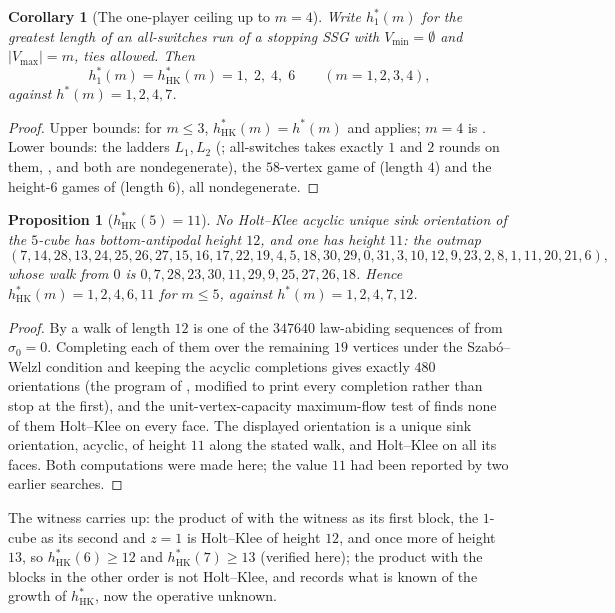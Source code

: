 \documentclass[11pt]{article}
\theoremstyle{plain}
\newtheorem{proposition}[theorem]{Proposition}
\newtheorem{corollary}[theorem]{Corollary}
\theoremstyle{definition}
\newcommand{\Vmax}{V_{\max}}
\newcommand{\Vmin}{V_{\min}}
\begin{document}
\begin{corollary}[The one-player ceiling up to $m=4$]\label{cor:hstar-one}
Write $h^{\ast}_{1}(m)$ for the greatest length of an all-switches run
of a stopping SSG with $\Vmin=\emptyset$ and $|\Vmax|=m$, ties allowed.
Then
\[
  h^{\ast}_{1}(m)=h^{\ast}_{\mathrm{HK}}(m)=1,\;2,\;4,\;6\qquad(m=1,2,3,4),
\]
against $h^{\ast}(m)=1,2,4,7$.
\end{corollary}

\begin{proof}
Upper bounds: for $m\le3$, $h^{\ast}_{\mathrm{HK}}(m)=h^{\ast}(m)$ and
 applies; $m=4$ is . Lower
bounds: the ladders $L_1,L_2$ (; all-switches takes
exactly $1$ and $2$ rounds on them, , and both are
nondegenerate), the $58$-vertex game of  (length
$4$) and the height-$6$ games of  (length $6$), all
nondegenerate.
\end{proof}

\begin{proposition}[$h^{\ast}_{\mathrm{HK}}(5)=11$]\label{prop:hkfive}
No Holt--Klee acyclic unique sink orientation of the $5$-cube has
bottom-antipodal height $12$, and one has height $11$: the outmap
\[
  (7,14,28,13,24,25,26,27,15,16,17,22,19,4,5,18,30,29,0,31,3,10,12,9,23,2,8,1,11,20,21,6),
\]
whose walk from $0$ is $0,7,28,23,30,11,29,9,25,27,26,18$. Hence
$h^{\ast}_{\mathrm{HK}}(m)=1,2,4,6,11$ for $m\le5$, against
$h^{\ast}(m)=1,2,4,7,12$.
\end{proposition}

\begin{proof}
By  a walk of length $12$ is one of the $347640$
law-abiding sequences of  from $\sigma_0=0$.
Completing each of them over the remaining $19$ vertices under the
Szab\'o--Welzl condition and keeping the acyclic completions gives exactly
$480$ orientations (the program of , modified to
print every completion rather than stop at the first), and the
unit-vertex-capacity maximum-flow test of 
finds none of them Holt--Klee on every face. The displayed orientation is
a unique sink orientation, acyclic, of height $11$ along the stated walk,
and Holt--Klee on all its faces. Both computations were made here; the
value $11$ had been reported by two earlier searches.
\end{proof}

The witness carries up: the product of  with the
witness as its first block, the $1$-cube as its second and $z=1$ is
Holt--Klee of height $12$, and once more of height $13$, so
$h^{\ast}_{\mathrm{HK}}(6)\ge12$ and $h^{\ast}_{\mathrm{HK}}(7)\ge13$
(verified here); the product with the blocks in the other order is not
Holt--Klee, and  records what is known of the
growth of $h^{\ast}_{\mathrm{HK}}$, now the operative unknown.
\end{document}
